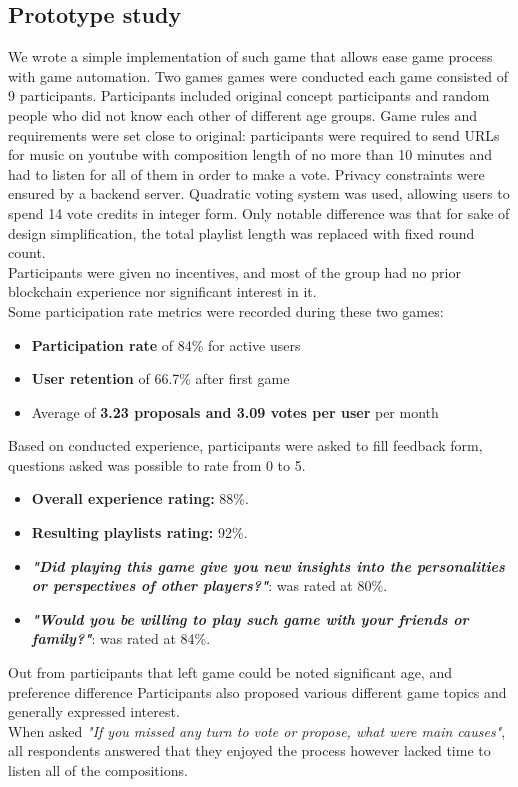 \documentclass{article}
\begin{document}
\begin{CJK}{UTF8}{gbsn}
\begin{multicols}{2}
        \subsection{Prototype study}
        We wrote a simple implementation of such game that allows ease game process with game automation. Two games games were conducted each game consisted of 9 participants. Participants included original concept participants and random people who did not know each other of different age groups. Game rules and requirements were set close to original: participants were required to send URLs for music on youtube with composition length of no more than 10 minutes and had to listen for all of them in order to make a vote. Privacy constraints were ensured by a backend server. Quadratic voting system was used, allowing users to spend 14 vote credits in integer form. Only notable difference  was that for sake of design simplification, the total playlist length was replaced with fixed round count.\\
        Participants were given no incentives, and most of the group had no prior blockchain experience nor significant interest in it.\\
        Some participation rate metrics were recorded during these two games:
        \begin{itemize}[nosep]
            \item \textbf{Participation rate} of 84\% for active users
            \item \textbf{User retention} of 66.7\% after first game
            \item Average of \textbf{3.23 proposals and 3.09 votes per user} per month
        \end{itemize}

        Based on conducted experience, participants were asked to fill feedback form, questions asked was possible to rate from 0 to 5.
        \begin{itemize}
            \setlength\itemsep{2px}
            \item \textbf{Overall experience rating:} 88\%.
            \item \textbf{Resulting playlists rating:} 92\%.
            \item \textbf{\textit{"Did playing this game give you new insights into the personalities or perspectives of other players?"}}: was rated at 80\%.
            \item \textbf{\textit{"Would you be willing to play such game with your friends or family?"}}: was rated at 84\%.
        \end{itemize}
        Out from participants that left game could be noted significant age, and preference difference
        Participants also proposed various different game topics and generally expressed interest. \\When asked \textit{"If you missed any turn to vote or propose, what were main causes"}, all respondents answered that they enjoyed the process however lacked time to listen all of the compositions.




\end{multicols}
\end{CJK}
\end{document}
